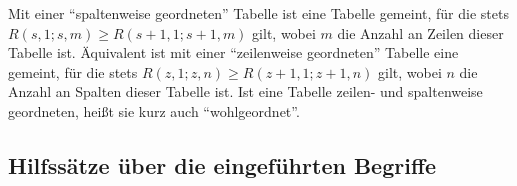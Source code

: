 \begin{definition}
    Mit einer "`spaltenweise geordneten"' Tabelle ist eine Tabelle gemeint, für die stets $R(s, 1; s, m)\geq 
    R(s+1, 1; s+1, m)$ gilt, wobei $m$ die Anzahl an Zeilen dieser Tabelle ist. Äquivalent ist mit einer 
    "`zeilenweise geordneten"' Tabelle eine gemeint, für die stets $R(z, 1; z, n)\geq R(z+1, 1; z+1, n)$ gilt, 
    wobei $n$ die Anzahl an Spalten dieser Tabelle ist. Ist eine Tabelle zeilen- und spaltenweise geordneten, heißt 
    sie kurz auch "`wohlgeordnet"'.
\end{definition}

\subsection*{Hilfssätze über die eingeführten Begriffe}

\renewcommand{\qedsymbol}{$\square$}

